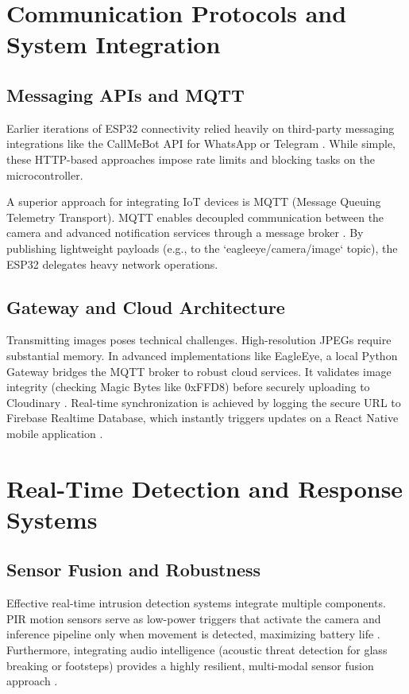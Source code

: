 \documentclass[12pt, a4paper]{article}
\begin{document}
\section{Communication Protocols and System Integration}

\subsection{Messaging APIs and MQTT}
Earlier iterations of ESP32 connectivity relied heavily on third-party messaging integrations like the CallMeBot API for WhatsApp or Telegram \cite{ref3, ref37, ref38, ref39, ref40}. While simple, these HTTP-based approaches impose rate limits and blocking tasks on the microcontroller. 

A superior approach for integrating IoT devices is MQTT (Message Queuing Telemetry Transport). MQTT enables decoupled communication between the camera and advanced notification services through a message broker \cite{ref41}. By publishing lightweight payloads (e.g., to the `eagleeye/camera/image` topic), the ESP32 delegates heavy network operations.

\subsection{Gateway and Cloud Architecture}
Transmitting images poses technical challenges. High-resolution JPEGs require substantial memory. In advanced implementations like EagleEye, a local Python Gateway bridges the MQTT broker to robust cloud services. It validates image integrity (checking Magic Bytes like 0xFFD8) before securely uploading to Cloudinary \cite{ref44}. Real-time synchronization is achieved by logging the secure URL to Firebase Realtime Database, which instantly triggers updates on a React Native mobile application \cite{ref45}.

\section{Real-Time Detection and Response Systems}

\subsection{Sensor Fusion and Robustness}
Effective real-time intrusion detection systems integrate multiple components. PIR motion sensors serve as low-power triggers that activate the camera and inference pipeline only when movement is detected, maximizing battery life \cite{ref40}. Furthermore, integrating audio intelligence (acoustic threat detection for glass breaking or footsteps) provides a highly resilient, multi-modal sensor fusion approach \cite{ref40, ref48}.
\end{document}
